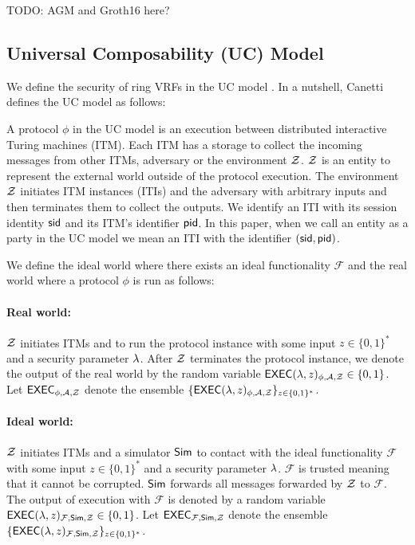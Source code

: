 TODO: AGM and Groth16 here?


\subsection{Universal Composability (UC) Model}
\label{subsec:uc_background}
We define the security of ring VRFs in the UC model \cite{canetti1,canetti2}. In a nutshell, Canetti \cite{canetti1,canetti2} defines the UC model as follows:

A protocol $ \phi $ in the UC model is an execution between distributed interactive Turing machines (ITM). Each ITM has a storage to collect the incoming messages from other ITMs, adversary \adv or the environment $ \mathcal{Z} $. $ \mathcal{Z} $ is an entity to represent the external world outside of the protocol execution.  The environment $ \mathcal{Z} $ initiates ITM instances (ITIs) and the adversary \adv with arbitrary inputs and then terminates them to collect the outputs.
We identify an ITI with its session identity $ \textsf{sid} $ and its ITM's identifier $ \textsf{pid} $. In this paper, when we call an entity as a party in the UC model we mean an ITI with the identifier $ (\textsf{sid}, \textsf{pid}) $.

We define the ideal world where there exists an ideal functionality $ \mathcal{F} $ and the real world where a protocol $ \phi $ is run as follows:

\paragraph{Real world:} $ \mathcal{Z} $ initiates ITMs and \adv to run the protocol instance with some input $ z \in \{0,1\}^* $  and a security parameter $ \lambda $. After $ \mathcal{Z} $ terminates the protocol instance, we denote the output of the real world by the random variable $ \mathsf{EXEC}(\lambda, z)_{\phi, \mathcal{A}, \mathcal{Z}} \in \{0,1\} $. Let $ \mathsf{EXEC}_{\phi, \mathcal{A}, \mathcal{Z}} $ denote the ensemble $ \{\mathsf{EXEC}(\lambda, z)_{\phi, \mathcal{A}, \mathcal{Z}} \}_{z \in \{0,1\}^*} $.

\paragraph{Ideal world:} $ \mathcal{Z} $ initiates ITMs and a simulator $ \mathsf{Sim} $ to contact with the ideal functionality $ \mathcal{F} $ with some input $ z \in \{0,1\}^* $  and a security parameter $ \lambda $. $ \mathcal{F} $ is trusted meaning that it cannot be corrupted.
$ \mathsf{Sim} $ forwards all messages forwarded by $ \mathcal{Z} $ to $ \mathcal{F} $. The output of execution with $ \mathcal{F} $ is denoted by a random variable $ \mathsf{EXEC}(\lambda, z)_{\mathcal{F},\mathsf{Sim}, \mathcal{Z}} \in \{0,1\}$.  Let $ \mathsf{EXEC}_{\mathcal{F},\mathsf{Sim}, \mathcal{Z}} $ denote the ensemble $ \{\mathsf{EXEC}(\lambda, z)_{\mathcal{F}, \mathsf{Sim}, \mathcal{Z}} \}_{z \in \{0,1\}^*} $.

